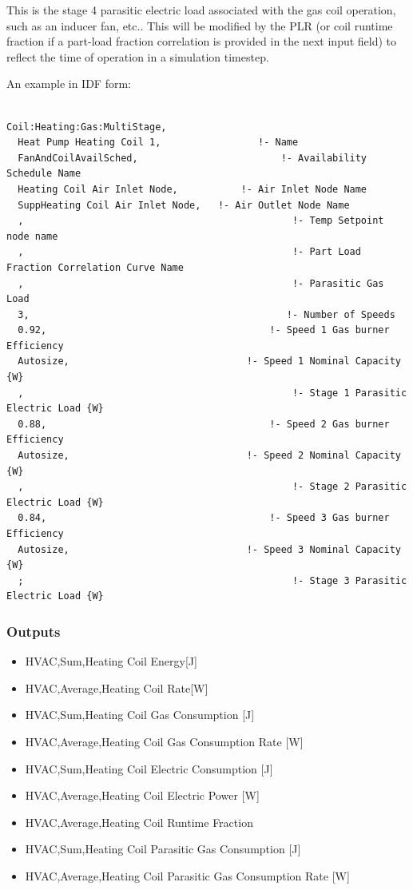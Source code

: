 This is the stage 4 parasitic electric load associated with the gas coil operation, such as an inducer fan, etc.. This will be modified by the PLR (or coil runtime fraction if a part-load fraction correlation is provided in the next input field) to reflect the time of operation in a simulation timestep.

An example in IDF form:

\begin{lstlisting}

Coil:Heating:Gas:MultiStage,
  Heat Pump Heating Coil 1,                 !- Name
  FanAndCoilAvailSched,                         !- Availability Schedule Name
  Heating Coil Air Inlet Node,           !- Air Inlet Node Name
  SuppHeating Coil Air Inlet Node,   !- Air Outlet Node Name
  ,                                               !- Temp Setpoint node name
  ,                                               !- Part Load Fraction Correlation Curve Name
  ,                                               !- Parasitic Gas Load
  3,                                             !- Number of Speeds
  0.92,                                       !- Speed 1 Gas burner Efficiency
  Autosize,                               !- Speed 1 Nominal Capacity {W}
  ,                                               !- Stage 1 Parasitic Electric Load {W}
  0.88,                                       !- Speed 2 Gas burner Efficiency
  Autosize,                               !- Speed 2 Nominal Capacity {W}
  ,                                               !- Stage 2 Parasitic Electric Load {W}
  0.84,                                       !- Speed 3 Gas burner Efficiency
  Autosize,                               !- Speed 3 Nominal Capacity {W}
  ;                                               !- Stage 3 Parasitic Electric Load {W}
\end{lstlisting}

\subsubsection{Outputs}\label{outputs-10-002}

\begin{itemize}
\item
  HVAC,Sum,Heating Coil Energy{[}J{]}
\item
  HVAC,Average,Heating Coil Rate{[}W{]}
\item
  HVAC,Sum,Heating Coil Gas Consumption {[}J{]}
\item
  HVAC,Average,Heating Coil Gas Consumption Rate {[}W{]}
\item
  HVAC,Sum,Heating Coil Electric Consumption {[}J{]}
\item
  HVAC,Average,Heating Coil Electric Power {[}W{]}
\item
  HVAC,Average,Heating Coil Runtime Fraction
\item
  HVAC,Sum,Heating Coil Parasitic Gas Consumption {[}J{]}
\item
  HVAC,Average,Heating Coil Parasitic Gas Consumption Rate {[}W{]}
\end{itemize}


